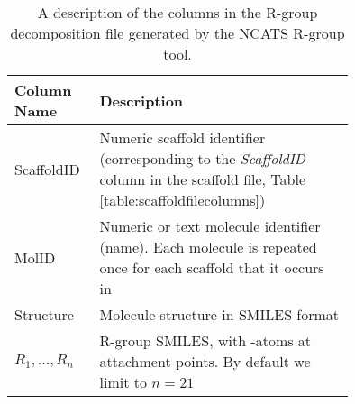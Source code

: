 \documentclass[11pt,letterpaper]{article}
\begin{document}
\begin{table}[h]
  \centering
  \begin{tabular}[h]{lp{0.75\linewidth}}
    \hline
    \textbf{Column Name} & \textbf{Description} \\
    \hline
    ScaffoldID & Numeric scaffold identifier (corresponding to
  the {\it ScaffoldID} column in the scaffold file, Table \ref{table:scaffoldfilecolumns}) \\
  MolID & Numeric or text molecule identifier (name). Each molecule is
  repeated once for each scaffold that it occurs in \\
  Structure & Molecule structure in SMILES format \\
  $R_1, \ldots, R_n$ & R-group SMILES, with \*-atoms at attachment
  points. By default we limit to $n = 21$ \\
  \hline
  \end{tabular}
  \caption{A description of the columns in the R-group decomposition
    file generated by the NCATS R-group tool.}
\end{table}
\end{document}
